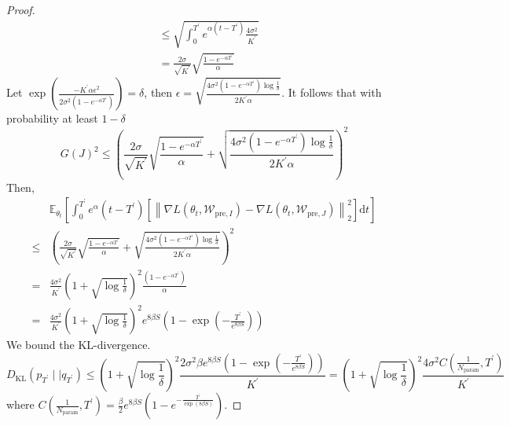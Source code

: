\begin{proof}
$$\begin{aligned}
		&\leq\sqrt{\int_0^{T^\prime}e^{\alpha(t-{T^\prime})}\frac{4\sigma^2}{K^\prime}} \\
		&=\frac{2\sigma}{\sqrt{K^\prime}}\sqrt{\frac{1-e^{-\alpha {T^\prime}}}{\alpha}}
	\end{aligned}
	$$
	Let $\exp\left(\frac{-K^\prime\alpha\epsilon^2}{2\sigma^2(1-e^{-\alpha {T^\prime}})}\right)={\delta}$, then $\epsilon =\sqrt{\frac{ 4\sigma^2(1-e^{-\alpha {T^\prime}}) \log \frac{1}{\delta}}{2K^\prime\alpha}}$. It follows that with probability at least $1-\delta$
	$$
	G(J)^2 \leq \left(\frac{2\sigma}{\sqrt{K^\prime}}\sqrt{\frac{1-e^{-\alpha {T^\prime}}}{\alpha}}+\sqrt{\frac{ 4\sigma^2(1-e^{-\alpha {T^\prime}}) \log \frac{1}{\delta}}{2K^\prime\alpha}}\right)^2
	$$
	Then,
	$$
	\begin{aligned}
		&\mathbb{E}_{\theta_t}\left[\int_0^{T^\prime} e^\alpha(t-{T^\prime})\left[\left\|\nabla L(\theta_t, \mathcal{W}_{\text{pre},I})-\nabla L(\theta_t, \mathcal{W}_{\text{pre},J})\right\|_2^2\right]\mathrm{d}t\right] \\
		\leq& \left(\frac{2\sigma}{\sqrt{K^\prime}}\sqrt{\frac{1-e^{-\alpha {T^\prime}}}{\alpha}}+\sqrt{\frac{ 4\sigma^2(1-e^{-\alpha {T^\prime}}) \log \frac{1}{\delta}}{2K^\prime\alpha}}\right)^2 \\
		=& \frac{4\sigma^2}{K^\prime}\left(1+\sqrt{\log \frac{1}{\delta}}\right)^2 \frac{(1-e^{-\alpha {T^\prime}})}{\alpha} \\
		=& \frac{4\sigma^2}{K^\prime}\left(1+\sqrt{\log \frac{1}{\delta}}\right)^2 e^{8\beta S}\left(1-\exp\left(-\frac{ {T^\prime}}{e^{8\beta S}}\right)\right)
	\end{aligned}
	$$
	We bound the KL-divergence.
	{\small
		\begin{equation}
			\label{topic-dependent-KL}
			D_{\operatorname{KL}}\left(p_{T^\prime}\mid\mid q_{T^\prime}\right)\leq\left(1+\sqrt{\log \frac{1}{\delta}}\right)^2 \frac{2\sigma^2\beta e^{8\beta S}(1-\exp(-\frac{ {T^\prime}}{e^{8\beta S}}))}{K^\prime}=\left(1+\sqrt{\log \frac{1}{\delta}}\right)^2 \frac{4\sigma^2C(\frac{1}{N_{\text{param}}},{T^\prime})}{K^\prime}
		\end{equation}
	}
	where $C(\frac{1}{N_{\text{param}}},{T^\prime})=\frac{\beta}{2}e^{8\beta S}\left(1-e^{-\frac{ {T^\prime}}{\exp(8\beta S)}}\right)$.
	

\end{proof}
